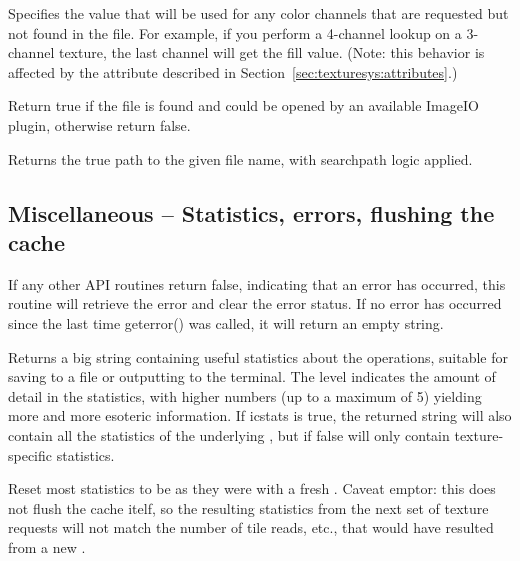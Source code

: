 \vspace{-24pt}
\vspace{10pt}
Specifies the value that will be used for any color channels that are
requested but not found in the file.  For example, if you perform a
4-channel lookup on a 3-channel texture, the last channel will
get the fill value.  (Note: this behavior is affected by the
 attribute described in 
Section~\ref{sec:texturesys:attributes}.)
\apiend

Return true if the file is found and could be opened by an
available ImageIO plugin, otherwise return false.

\apiend

Returns the true path to the given file name, with searchpath logic
applied.
\apiend

\subsection{Miscellaneous -- Statistics, errors, flushing the cache}
\label{sec:texturesys:api:geterror}
\label{sec:texturesys:api:getstats}
\label{sec:texturesys:api:resetstats}
\label{sec:texturesys:api:invalidate}

If any other API routines return {\cf false}, indicating that an
error has occurred, this routine will retrieve the error and clear
the error status.  If no error has occurred since the last time
{\cf geterror()} was called, it will return an empty string.
\apiend

Returns a big string containing useful statistics about the \ImageCache
operations, suitable for saving to a file or outputting to the terminal.
The {\cf level} indicates the amount of detail in the statistics,
with higher numbers (up to a maximum of 5) yielding more and more
esoteric information.  If {\cf icstats} is true, the returned string
will also contain all the statistics of the underlying \ImageCache,
but if false will only contain texture-specific statistics.
\apiend

Reset most statistics to be as they were with a fresh
\ImageCache.  Caveat emptor: this does not flush the cache
itelf, so the resulting statistics from the next set of texture
requests will not match the number of tile reads, etc., that
would have resulted from a new \ImageCache.
\apiend

